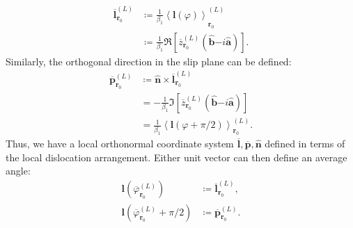 \begin{subequations}
    \label{eq:4avorient}
    \begin{align}    {\overline{\boldsymbol{l}}}_{\boldsymbol{r}_{0}}^{(L)} &\coloneqq {\frac{1}{\beta_{1}}\left\langle \boldsymbol{l}(\varphi) \right\rangle}_{\boldsymbol{r}_{0}}^{(L)} \\
    &\coloneqq\frac{1}{\beta_{1}}\Re\left\lbrack {\overline{z}}_{\boldsymbol{r}_{0}}^{(L)}\left( \hat{\boldsymbol{b}}\boldsymbol{-}i\hat{\boldsymbol{a}} \right) \right\rbrack.
\end{align}
\end{subequations}
Similarly, the orthogonal direction in the slip plane can be defined:
\begin{subequations}
    \begin{align}
    {\overline{\boldsymbol{p}}}_{\boldsymbol{r}_{0}}^{(L)} &\coloneqq \hat{\boldsymbol{n}} \times {\overline{\boldsymbol{l}}}_{\boldsymbol{r}_{0}}^{(L)} \\
    &=-\frac{1}{\beta_{1}}\Im\left\lbrack {\overline{z}}_{\boldsymbol{r}_{0}}^{(L)}\left( \hat{\boldsymbol{b}}\boldsymbol{-}i\hat{\boldsymbol{a}} \right) \right\rbrack\\
    &=\frac{1}{\beta_{1}}\left\langle \boldsymbol{l}\left( \varphi + \pi/2 \right) \right\rangle_{\boldsymbol{r}_{0}}^{(L)}.
\end{align}
\end{subequations}
Thus, we have a local orthonormal coordinate system \(\overline{\boldsymbol{l}},\overline{\boldsymbol{p}},\hat{\boldsymbol{n}}\) defined in terms of the local dislocation arrangement. Either unit vector can then define an average angle:
\begin{subequations}
    \begin{align}
    \boldsymbol{l}\left( {\overline{\varphi}}_{\boldsymbol{r}_{0}}^{(L)} \right) &\coloneqq {\overline{\boldsymbol{l}}}_{\boldsymbol{r}_{0}}^{(L)},\label{eq:averageangleDef}\\
    \boldsymbol{l}\left( {\overline{\varphi}}_{\boldsymbol{r}_{0}}^{(L)} + \pi/2 \right) &\coloneqq {\overline{\boldsymbol{p}}}_{\boldsymbol{r}_{0}}^{(L)}.
\end{align}
\end{subequations} 

